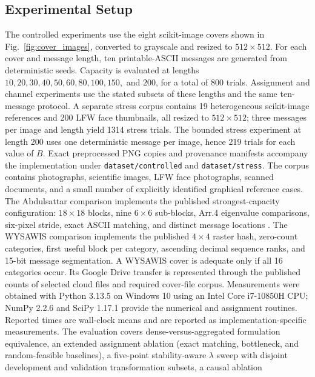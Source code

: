 \documentclass[preprint,12pt]{elsarticle}
\theoremstyle{plain}
\providecommand{\DIFaddtex}[1]{{\protect\color{blue} \sf #1}} %
\providecommand{\DIFdeltex}[1]{{\protect\color{red} \scriptsize #1}} %
\providecommand{\DIFaddbegin}{} %
\providecommand{\DIFaddend}{} %
\providecommand{\DIFdelbegin}{} %
\providecommand{\DIFdelend}{} %
\providecommand{\DIFadd}[1]{\texorpdfstring{\DIFaddtex{#1}}{#1}} %
\providecommand{\DIFdel}[1]{\texorpdfstring{\DIFdeltex{#1}}{}} %
\providecommand{\DIFscaledelfig}{0.5}
\newlength{\DIFdelgraphicswidth} %
\newlength{\DIFdelgraphicsheight} %
\providecommand{\DIFaddincludegraphics}[2][]{{\color{blue}\fbox{\DIFOincludegraphics[#1]{#2}}}} %
\providecommand{\DIFdelincludegraphics}[2][]{%
\sbox{\DIFdelgraphicsbox}{\DIFOincludegraphics[#1]{#2}}%
\settoboxwidth{\DIFdelgraphicswidth}{\DIFdelgraphicsbox} %
\settoboxtotalheight{\DIFdelgraphicsheight}{\DIFdelgraphicsbox} %
\scalebox{\DIFscaledelfig}{%
\parbox[b]{\DIFdelgraphicswidth}{\usebox{\DIFdelgraphicsbox}\\[-\baselineskip] \rule{\DIFdelgraphicswidth}{0em}}\llap{\resizebox{\DIFdelgraphicswidth}{\DIFdelgraphicsheight}{%
\setlength{\unitlength}{\DIFdelgraphicswidth}%
\begin{picture}(1,1)%
\thicklines\linethickness{2pt} %
{\color[rgb]{1,0,0}\put(0,0){\framebox(1,1){}}}%
{\color[rgb]{1,0,0}\put(0,0){\line( 1,1){1}}}%
{\color[rgb]{1,0,0}\put(0,1){\line(1,-1){1}}}%
\end{picture}%
}\hspace*{3pt}}} %
} %
\DeclareRobustCommand{\DIFaddbegin}{\DIFOaddbegin \let\includegraphics\DIFaddincludegraphics} %
\DeclareRobustCommand{\DIFaddend}{\DIFOaddend \let\includegraphics\DIFOincludegraphics} %
\DeclareRobustCommand{\DIFdelbegin}{\DIFOdelbegin \let\includegraphics\DIFdelincludegraphics} %
\DeclareRobustCommand{\DIFdelend}{\DIFOaddend \let\includegraphics\DIFOincludegraphics} %
\renewcommand{\DIFdel}[1]{}
\renewcommand{\DIFdelincludegraphics}[2][]{}
\begin{document}
\subsection{Experimental Setup}

The controlled experiments use the eight scikit-image covers shown in
Fig.~\ref{fig:cover_images}, converted to grayscale and resized to
$512\times512$. For each cover and message length, ten printable-ASCII messages
are generated from deterministic seeds. Capacity is evaluated at lengths
$10,20,30,40,50,60,80,100,150,$ and $200$, for a total of 800 trials.
Assignment and channel experiments use the stated subsets of these lengths and
the same ten-message protocol. A separate stress corpus contains 19
heterogeneous scikit-image references and 200 LFW face thumbnails, all resized
to $512\times512$; three messages per image and length yield 1314 stress trials.
The bounded stress experiment at length 200 uses one deterministic message per
image, hence 219 trials for each value of $B$.
Exact preprocessed PNG copies and provenance manifests accompany the
implementation under \texttt{dataset/controlled} and \texttt{dataset/stress}.
The corpus contains photographs,
scientific images, LFW face photographs, scanned documents, and a small number
of explicitly identified graphical reference cases.
The Abdulsattar comparison implements the published strongest-capacity
configuration: $18\times18$ blocks, nine $6\times6$ sub-blocks, Arr.4
eigenvalue comparisons, six-pixel stride, exact ASCII matching, and \DIFdelbegin \DIFdel{no
location reuse }\DIFdelend \DIFaddbegin \DIFadd{distinct
message locations }\DIFaddend \cite{abdulsattar2021}. The WYSAWIS comparison implements the
published $4\times4$ raster hash, zero-count categories, first useful block per
category, ascending decimal sequence ranks, and 15-bit message segmentation.
A WYSAWIS cover is adequate only if all 16 categories occur. Its Google Drive
transfer is represented through the published counts of selected cloud files
and required cover-file corpus.
Measurements were obtained with Python 3.13.5
on Windows 10 using an Intel Core i7-10850H CPU; NumPy 2.2.6 and SciPy 1.17.1
provide the numerical and assignment routines. Reported times are wall-clock
means and are reported as implementation-specific measurements.
The evaluation covers dense-versus-aggregated formulation equivalence, an
extended assignment ablation (exact matching, bottleneck, and
random-feasible baselines), a five-point stability-aware $\lambda$ sweep with
disjoint development and validation transformation subsets, a causal ablation
\end{document}
